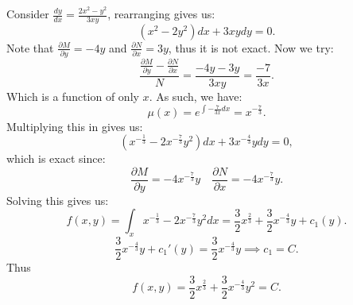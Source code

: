 \documentclass[../main/main.tex]{subfiles}
\begin{document}
\begin{example}
	Consider $\frac{dy}{dx}= \frac{2x^2-y^2}{3xy}$, rearranging gives us: \[
		(x^2-2y^2)dx + 3xy dy = 0
	.\] Note that $\frac{\partial M}{\partial y}  = -4y$ and $\frac{\partial N}{\partial x} =3y$, thus it is not exact. Now we try: \[
	\frac{\frac{\partial M}{\partial y} -\frac{\partial N}{\partial x} }{N}=\frac{-4y-3y}{3xy}=\frac{-7}{3x} 
	.\] Which is a function of only $x$. As such, we have: \[
	\mu(x) = e^{\int-\frac{7}{3x} dx } = x^{-\frac{7}{3}} 
	.\] Multiplying this in gives us: \[
	(x^{-\frac{1}{3}}-2x^{-\frac{7}{3}}y^{2})dx + 3x^{-\frac{4}{3}}ydy=0
	,\]  which is exact since: \[
	\frac{\partial M}{\partial y} =-4x^{-\frac{7}{3}}y \quad \frac{\partial N}{\partial x} = -4 x^{-\frac{7}{3}}y
	.\] Solving this gives us: \[
	f(x,y) = \int_x x^{-\frac{1}{3}}-2x^{-\frac{7}{3}}y^2 dx = \frac{3}{2}x^{\frac{2}{3}}+\frac{3}{2}x^{-\frac{4}{3}}y+c_1(y)
	.\] \[
	\frac{3}{2}x^{-\frac{4}{3}}y+c_1'(y) = \frac{3}{2}x^{-\frac{4}{3}}y\implies c_1 = C
	.\]Thus \[
	f(x,y) = \frac{3}{2}x^{\frac{2}{3}}+\frac{3}{2}x^{-\frac{4}{3}}y^2=C
	.\] 
\end{example}
\end{document}
